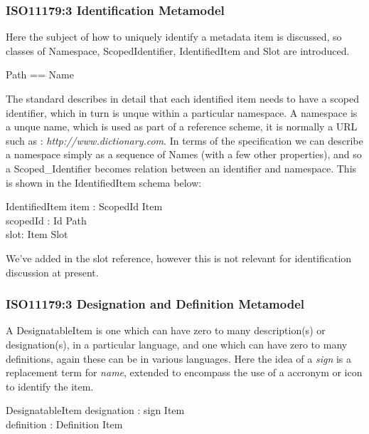 \documentclass{llncs}
\begin{document}
\subsubsection{ISO11179:3 Identification Metamodel }
Here the subject of how to uniquely identify a metadata item is discussed, so classes of Namespace, ScopedIdentifier, IdentifiedItem and Slot are introduced.

\begin{zed}
  Path == \seq Name \\
  [Item, ScopedId, Slot, Organization, Namespace]
  \end{zed}


The standard describes in detail that each identified item needs to have a scoped identifier, which in turn is unque within a particular namespace. A namespace is a unque name, which is used as part of a reference scheme, it is normally a URL such as : \emph{http://www.dictionary.com}. In terms of the specification we can describe a namespace simply as a sequence of Names (with a few other properties), and so a Scoped\_Identifier becomes relation between an identifier and namespace. This is shown in the IdentifiedItem schema below: 


\begin{schema}{IdentifiedItem}
  item : ScopedId \pfun Item \\
  scopedId : Id \pfun Path \\
  slot: Item \pfun Slot
\end{schema}

We've added in the slot reference, however this is not relevant for identification discussion at present.

\subsubsection{ISO11179:3 Designation and Definition Metamodel}

A DesignatableItem is one which can have zero to many description(s) or designation(s), in a particular language, and one which can have zero to many definitions, again these can be in various languages. Here the idea of a \emph{sign} is a replacement term for \emph{name}, extended to encompass the use of a accronym or icon to identify the item.
\begin{schema}{DesignatableItem}
  designation : sign \pfun Item \\
  definition : Definition \pfun Item \\
\end{schema}
\end{document}
